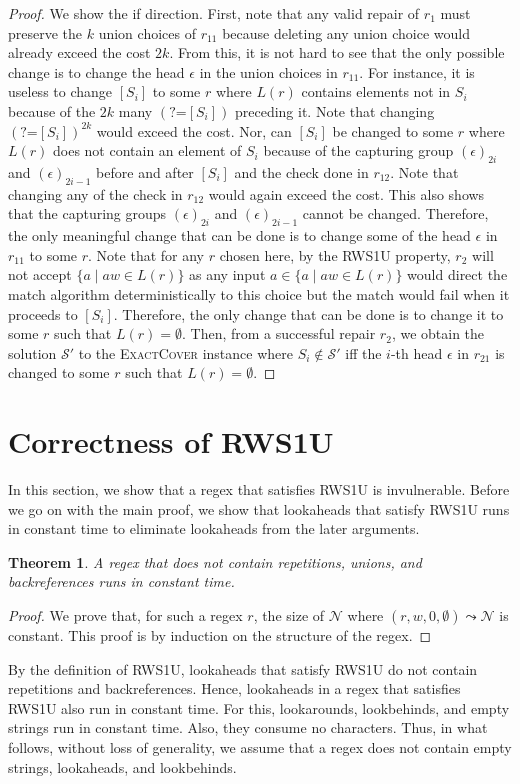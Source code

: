 \documentclass[conference]{IEEEtran}
\newcommand{\ltp}{RWS1U}
\newtheorem{theorem}{Theorem}[section]
\begin{document}
\begin{proof}
We show the if direction.  First, note that any valid repair of $r_1$ must preserve the $k$ union choices of $r_{11}$ because deleting any union choice would already exceed the cost $2k$.  From this, it is not hard to see that the only possible change is to change the head $\epsilon$ in the union choices in $r_{11}$.  For instance, it is useless to change $[S_i]$ to some $r$ where $L(r)$ contains elements not in $S_i$ because of the $2k$ many $(\mbox{?=}[S_i])$ preceding it.  Note that changing $(\mbox{?=}[S_i])^{2k}$ would exceed the cost.  Nor, can $[S_i]$ be changed to some $r$ where $L(r)$ does not contain an element of $S_i$ because of the capturing group $(\epsilon)_{2i}$ and $(\epsilon)_{2i-1}$ before and after $[S_i]$ and the check done in $r_{12}$.  Note that changing any of the check in $r_{12}$ would again exceed the cost.  This also shows that the capturing groups $(\epsilon)_{2i}$ and $(\epsilon)_{2i-1}$ cannot be changed. Therefore, the only meaningful change that can be done is to change some of the head $\epsilon$ in $r_{11}$ to some $r$.  Note that for any $r$ chosen here, by the \ltp{} property, $r_2$ will not accept $\{ a \mid aw \in L(r) \}$ as any input $a \in \{ a \mid aw \in L(r) \}$ would direct the match algorithm deterministically to this choice but the match would fail when it proceeds to $[S_i]$.  Therefore, the only change that can be done is to change it to some $r$ such that $L(r) = \emptyset$.  Then, from a successful repair $r_2$, we obtain the solution $\mathcal{S'}$ to the \textsc{ExactCover} instance  where $S_i \notin \mathcal{S'}$ iff the $i$-th head $\epsilon$ in $r_{21}$ is changed to some $r$ such that $L(r) = \emptyset$.
\end{proof}

\section{Correctness of \ltp{}}
\label{subsec:proof}
In this section, we show that a regex that satisfies \ltp{} is invulnerable.
Before we go on with the main proof, we show that lookaheads that satisfy \ltp{} runs in constant time to eliminate lookaheads from the later arguments.
\begin{theorem}
\label{theo:starfree}
A regex that does not contain repetitions, unions, and backreferences runs in constant time.
\end{theorem}
\begin{proof}
We prove that, for such a regex $r$, the size of $\mathcal{N}$ where $(r,w,0,\emptyset)\leadsto \mathcal{N}$ is constant.
This proof is by induction on the structure of the regex. 
\end{proof}
By the definition of \ltp{}, lookaheads that satisfy \ltp{} do not contain repetitions and backreferences.
Hence, lookaheads in a regex that satisfies \ltp{} also run in constant time.
For this, lookarounds, lookbehinds, and empty strings run in constant time.  Also, they consume no characters.
Thus, in what follows, without loss of generality, we assume that a regex does not contain empty strings, lookaheads, and lookbehinds.
\end{document}
